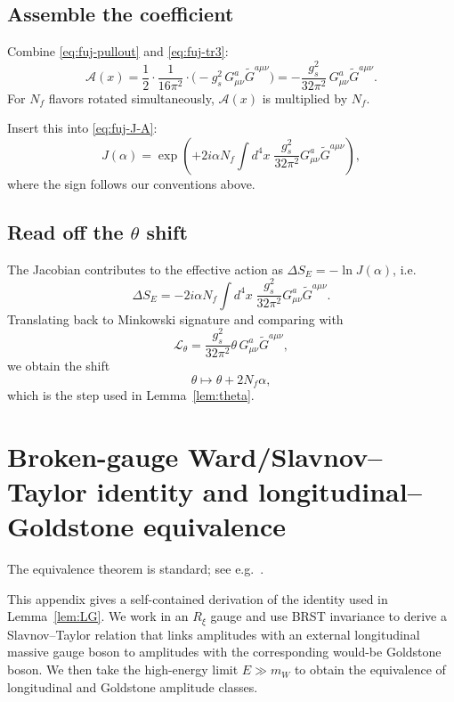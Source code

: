 \documentclass[11pt]{article}
\theoremstyle{remark}
\begin{document}
\subsection{Assemble the coefficient}
Combine \eqref{eq:fuj-pullout} and \eqref{eq:fuj-tr3}:
\begin{equation}
\mathcal{A}(x)
=
\frac{1}{2}\cdot\frac{1}{16\pi^2}\cdot\Big(- g_s^2\,G_{\mu\nu}^a\tilde G^{a\mu\nu}\Big)
=
-\frac{g_s^2}{32\pi^2}\,G_{\mu\nu}^a\tilde G^{a\mu\nu}.
\end{equation}
For $N_f$ flavors rotated simultaneously, $\mathcal{A}(x)$ is multiplied by $N_f$.

Insert this into \eqref{eq:fuj-J-A}:
\begin{equation}\label{eq:fuj-Jfinal}
J(\alpha)=\exp\!\left(+2i\alpha N_f\int d^4x\;\frac{g_s^2}{32\pi^2}G_{\mu\nu}^a\tilde G^{a\mu\nu}\right),
\end{equation}
where the sign follows our conventions above.

\subsection{Read off the $\theta$ shift}
The Jacobian contributes to the effective action as $\Delta S_E = -\ln J(\alpha)$, i.e.
\begin{equation}
\Delta S_E
=
-2i\alpha N_f\int d^4x\;\frac{g_s^2}{32\pi^2}G_{\mu\nu}^a\tilde G^{a\mu\nu}.
\end{equation}
Translating back to Minkowski signature and comparing with
\begin{equation}
\mathcal{L}_\theta = \frac{g_s^2}{32\pi^2}\theta\,G_{\mu\nu}^a\tilde G^{a\mu\nu},
\end{equation}
we obtain the shift
\begin{equation}
\theta \mapsto \theta + 2N_f\alpha,
\end{equation}
which is the step used in Lemma~\ref{lem:theta}.

\section{Broken-gauge Ward/Slavnov--Taylor identity and longitudinal--Goldstone equivalence}\label{app:LG-proof}
The equivalence theorem is standard; see e.g.\ \cite{Cornwall1974,Chanowitz1985}.

This appendix gives a self-contained derivation of the identity used in Lemma~\ref{lem:LG}.
We work in an $R_\xi$ gauge and use BRST invariance to derive a Slavnov--Taylor relation that links
amplitudes with an external longitudinal massive gauge boson to amplitudes with the corresponding
would-be Goldstone boson. We then take the high-energy limit $E\gg m_W$ to obtain the equivalence
of longitudinal and Goldstone amplitude classes.
\end{document}
